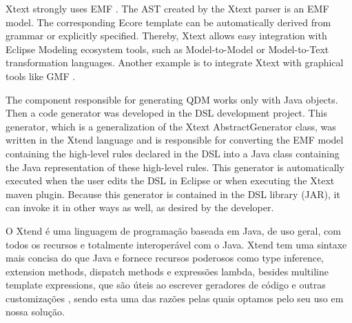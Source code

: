 Xtext strongly uses EMF \cite{blewitt2013}. The AST created by the Xtext parser is an EMF model. The corresponding Ecore template can be automatically derived from grammar or explicitly specified. Thereby, Xtext allows easy integration with Eclipse Modeling ecosystem tools, such as Model-to-Model or Model-to-Text transformation languages. Another example is to integrate Xtext with graphical tools like GMF \cite{eysholdt2010}.


The component responsible for generating QDM works only with Java objects. Then a code generator was developed in the DSL development project. This generator, which is a generalization of the Xtext AbstractGenerator class, was written in the Xtend language and is responsible for converting the EMF model containing the high-level rules declared in the DSL into a Java class containing the Java representation of these high-level rules. This generator is automatically executed when the user edits the DSL in Eclipse or when executing the Xtext maven plugin. Because this generator is contained in the DSL library (JAR), it can invoke it in other ways as well, as desired by the developer.

O Xtend é uma linguagem de programação baseada em Java, de uso geral, com todos os recursos e totalmente interoperável com o Java. Xtend tem uma sintaxe mais concisa do que Java e fornece recursos poderosos como type inference, extension methods, dispatch methods e expressões lambda, besides multiline template expressions, que são úteis ao escrever geradores de código e outras customizações \cite{bettini2016}, sendo esta uma das razões pelas quais optamos pelo seu uso em nossa solução.


